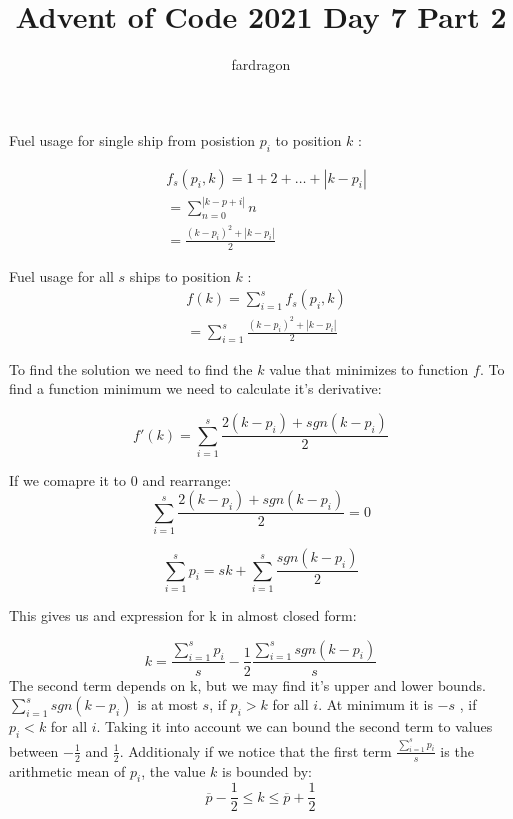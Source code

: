 \documentclass[a4paper,10pt]{article}
\title{Advent of Code 2021 Day 7 Part 2}
\author{fardragon}
\begin{document}
\maketitle

Fuel usage for single ship from posistion $p_i$ to position $k$ :

\begin{equation}
\begin{split}
& f_s (p_i, k) = 1+2+ \dots + |k - p_i| \\
& = \sum^{|k - p+i|}_{n = 0} n \\
& = \frac{(k-p_i)^2 + |k-p_i|}{2}
\end{split}
\end{equation}


Fuel usage for all $s$ ships to position $k$ :
\begin{equation}
\begin{split}
& f(k) = \sum^{s}_{i=1} f_s(p_i, k) \\
& = \sum^{s}_{i=1} \frac{(k-p_i)^2 + |k-p_i|}{2}
\end{split}
\end{equation}

To find the solution we need to find the $k$ value that minimizes to function $f$.
To find a function minimum we need to calculate it's derivative:

\begin{equation}
f'(k) = \sum^{s}_{i=1} \frac{2(k-p_i) + sgn(k - p_i)}{2}
\end{equation}

If we comapre it to $0$ and rearrange:
\begin{equation}
\sum^{s}_{i=1} \frac{2(k-p_i) + sgn(k - p_i)}{2} = 0
\end{equation}

\begin{equation}
\sum^{s}_{i=1} p_i = sk + \sum^{s}_{i=1} \frac{sgn(k - p_i)}{2}
\end{equation}

This gives us and expression for k in almost closed form:

\begin{equation}
k = \frac{\sum^{s}_{i=1}p_i}{s} - \frac{1}{2}\frac{\sum^{s}_{i=1} sgn(k - p_i)}{s}
\end{equation}
\clearpage
The second term depends on k, but we may find it's upper and lower bounds. $\sum^{s}_{i=1} sgn(k - p_i)$ is at most $s$, if $p_i > k$ for all $i$. At minimum it is $-s$ , if $p_i < k$ for all $i$. Taking it into account we can bound the second term to values between $-\frac{1}{2}$ and $\frac{1}{2}$. Additionaly if we notice that the first term $\frac{\sum^{s}_{i=1}p_i}{s}$ is the arithmetic mean of $p_i$, the value $k$ is bounded by:
\begin{equation}
\overline{p} - \frac{1}{2} \leq k \leq \overline{p} + \frac{1}{2}
\end{equation}
\end{document}
